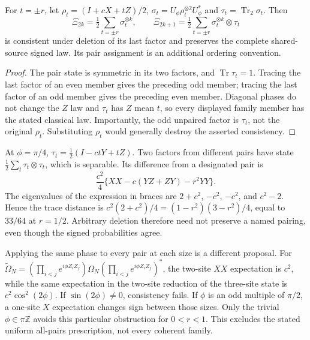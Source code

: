 \begin{proposition}
For $t=\pm r$, let $\rho_t=(I+cX+tZ)/2$,
$\sigma_t=U_\phi\rho_t^{\otimes2}U_\phi^*$ and $\tau_t=\operatorname{Tr}_2\sigma_t$.
Then
\[
 \Xi_{2k}=\tfrac12\sum_{t=\pm r}\sigma_t^{\otimes k},\qquad
 \Xi_{2k+1}=\tfrac12\sum_{t=\pm r}\sigma_t^{\otimes k}\otimes\tau_t
\]
is consistent under deletion of its last factor and preserves the complete shared-source signed law. Its pair assignment is an additional ordering convention.
\end{proposition}
\begin{proof}
The pair state is symmetric in its two factors, and $\operatorname{Tr}\tau_t=1$. Tracing the last factor of an even member gives the preceding odd member; tracing the last factor of an odd member gives the preceding even member. Diagonal phases do not change the $Z$ law and $\tau_t$ has $Z$ mean $t$, so every displayed family member has the stated classical law. Importantly, the odd unpaired factor is $\tau_t$, not the original $\rho_t$. Substituting $\rho_t$ would generally destroy the asserted consistency.
\end{proof}
At $\phi=\pi/4$,
$\tau_t=\tfrac12(I-ctY+tZ)$.
Two factors from different pairs have state $\tfrac12\sum_t\tau_t\otimes\tau_t$, which is separable. Its difference from a designated pair is
\[
 \frac{c^2}{4}\{XX-c(YZ+ZY)-r^2YY\}.
\]
The eigenvalues of the expression in braces are $2+c^2$, $-c^2$, $-c^2$, and $c^2-2$. Hence the trace distance is
$c^2(2+c^2)/4=(1-r^2)(3-r^2)/4$, equal to $33/64$ at $r=1/2$.
Arbitrary deletion therefore need not preserve a named pairing, even though the signed probabilities agree.

Applying the same phase to every pair at each size is a different proposal. For
$\widetilde\Omega_N=(\prod_{i<j}e^{i\phi Z_iZ_j})\Omega_N(\prod_{i<j}e^{i\phi Z_iZ_j})^*$,
the two-site $XX$ expectation is $c^2$, while the same expectation in the two-site reduction of the three-site state is $c^2\cos^2(2\phi)$. If $\sin(2\phi)\ne0$, consistency fails. If $\phi$ is an odd multiple of $\pi/2$, a one-site $X$ expectation changes sign between those sizes. Only the trivial $\phi\in\pi\mathbb Z$ avoids this particular obstruction for $0<r<1$. This excludes the stated uniform all-pairs prescription, not every coherent family.

